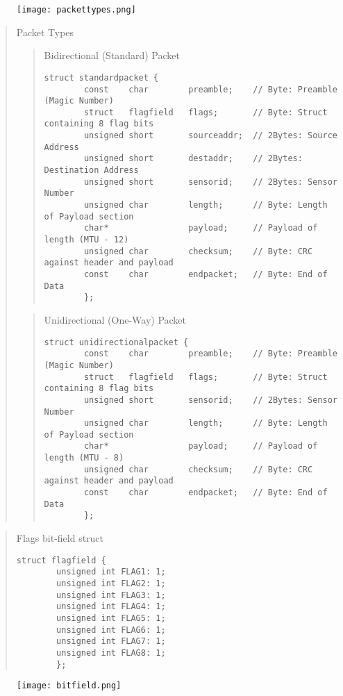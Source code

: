 \documentclass[letterpaper]{article}
\begin{document}
\begin{figure}
\centering
\texttt{[image: packettypes.png]}
\end{figure}
\hrulefill

\begin{quote}
Packet Types

\begin{quote}
Bidirectional (Standard) Packet
\begin{verbatim}
struct standardpacket {
        const    char        preamble;    // Byte: Preamble (Magic Number)
        struct   flagfield   flags;       // Byte: Struct containing 8 flag bits
        unsigned short       sourceaddr;  // 2Bytes: Source Address 
        unsigned short       destaddr;    // 2Bytes: Destination Address 
        unsigned short       sensorid;    // 2Bytes: Sensor Number 
        unsigned char        length;      // Byte: Length of Payload section
        char*                payload;     // Payload of length (MTU - 12)
        unsigned char        checksum;    // Byte: CRC against header and payload
        const    char        endpacket;   // Byte: End of Data
        };
\end{verbatim}
\end{quote}


\begin{quote}
Unidirectional (One-Way) Packet
\begin{verbatim}
struct unidirectionalpacket {
        const    char        preamble;    // Byte: Preamble (Magic Number)
        struct   flagfield   flags;       // Byte: Struct containing 8 flag bits
        unsigned short       sensorid;    // 2Bytes: Sensor Number 
        unsigned char        length;      // Byte: Length of Payload section
        char*                payload;     // Payload of length (MTU - 8)
        unsigned char        checksum;    // Byte: CRC against header and payload
        const    char        endpacket;   // Byte: End of Data
        };
\end{verbatim}
\end{quote}

\end{quote}
\hrulefill

\begin{multicols}{2}
\begin{quote}
Flags bit-field struct
\begin{verbatim}
struct flagfield {
        unsigned int FLAG1: 1;
        unsigned int FLAG2: 1;
        unsigned int FLAG3: 1;
        unsigned int FLAG4: 1;
        unsigned int FLAG5: 1;
        unsigned int FLAG6: 1;
        unsigned int FLAG7: 1;
        unsigned int FLAG8: 1;
        };
\end{verbatim}
\end{quote}
\columnbreak

\begin{figure}[H]
\centering
\texttt{[image: bitfield.png]}
\end{figure}

\end{multicols}
\end{document}
